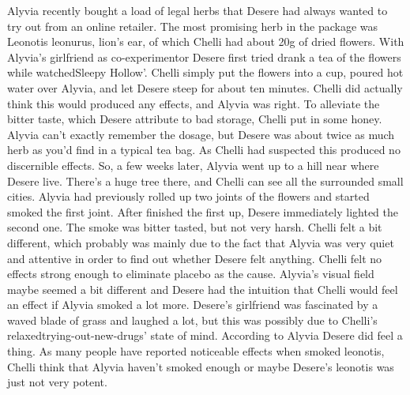 \documentclass[12pt]{book}
\begin{document}
Alyvia recently bought a load of legal herbs that Desere had always wanted to try out from an online retailer. The most promising herb in the package was Leonotis leonurus, lion's ear, of which Chelli had about 20g of dried flowers. With Alyvia's girlfriend as co-experimentor Desere first tried drank a tea of the flowers while watchedSleepy Hollow'. Chelli simply put the flowers into a cup, poured hot water over Alyvia, and let Desere steep for about ten minutes. Chelli did actually think this would produced any effects, and Alyvia was right. To alleviate the bitter taste, which Desere attribute to bad storage, Chelli put in some honey. Alyvia can't exactly remember the dosage, but Desere was about twice as much herb as you'd find in a typical tea bag. As Chelli had suspected this produced no discernible effects. So, a few weeks later, Alyvia went up to a hill near where Desere live. There's a huge tree there, and Chelli can see all the surrounded small cities. Alyvia had previously rolled up two joints of the flowers and started smoked the first joint. After finished the first up, Desere immediately lighted the second one. The smoke was bitter tasted, but not very harsh. Chelli felt a bit different, which probably was mainly due to the fact that Alyvia was very quiet and attentive in order to find out whether Desere felt anything. Chelli felt no effects strong enough to eliminate placebo as the cause. Alyvia's visual field maybe seemed a bit different and Desere had the intuition that Chelli would feel an effect if Alyvia smoked a lot more. Desere's girlfriend was fascinated by a waved blade of grass and laughed a lot, but this was possibly due to Chelli's relaxedtrying-out-new-drugs' state of mind. According to Alyvia Desere did feel a thing. As many people have reported noticeable effects when smoked leonotis, Chelli think that Alyvia haven't smoked enough or maybe Desere's leonotis was just not very potent.
\end{document}
